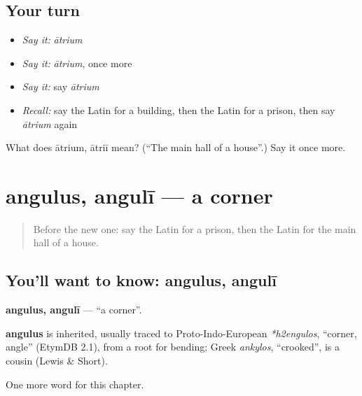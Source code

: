 \subsection*{Your turn}
\begin{itemize}
\raggedright
  \item \emph{Say it:} \emph{ātrium}
  \item \emph{Say it:} \emph{ātrium}, once more
  \item \emph{Say it:} say \emph{ātrium}
  \item \emph{Recall:} say the Latin for a building, then the Latin for a prison, then say \emph{ātrium} again
\end{itemize}

\begin{tcolorbox}[breakable,colback=teal!4,colframe=teal!35!black,title={Before you move on}]
What does ātrium, ātriī mean? (\textquotedblleft{}The main hall of a house\textquotedblright{}.) Say it once more.
\end{tcolorbox}
\section[angulus, angulī]{angulus, angulī — a corner}

\label{lesson:LA-C116-angulus}



\begin{quote}
Before the new one: say the Latin for a prison, then the Latin for the main hall of a house.
\end{quote}

\subsection*{You'll want to know: angulus, angulī}
\textbf{angulus, angulī} — \textquotedblleft{}a corner\textquotedblright{}.

\begin{cousinweb}
\textbf{angulus} is inherited, usually traced to Proto-Indo-European \emph{*h2engulos}, \textquotedblleft{}corner, angle\textquotedblright{} (EtymDB 2.1), from a root for bending; Greek \emph{ankylos}, \textquotedblleft{}crooked\textquotedblright{}, is a cousin (Lewis \& Short).
\end{cousinweb}

\begin{grammarlens}[title={What you've built}]
One more word for this chapter.
\end{grammarlens}

